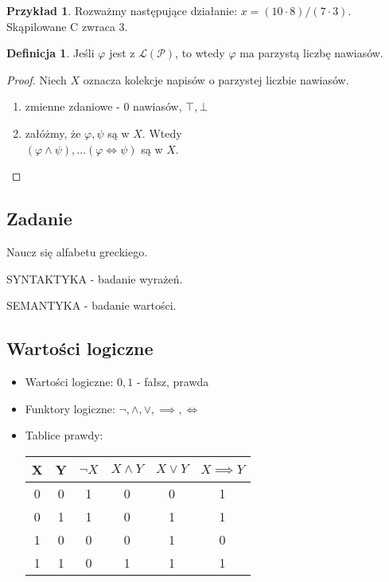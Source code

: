 \documentclass{article}
\theoremstyle{definition}
\newtheorem{de}{Definicja}[subsection]
\theoremstyle{definition}
\theoremstyle{definition}
\newtheorem{pk}{Przykład}[subsection]
\theoremstyle{definition}
\begin{document}
\begin{pk}
Rozważmy następujące działanie: $x=(10\cdot 8)/(7\cdot 3)$. Skąpilowane C zwraca $3$.
\end{pk}

\begin{de}
Jeśli $\varphi$ jest z $\mathcal{L}(\mathcal{P})$, to wtedy $\varphi$ ma parzystą liczbę nawiasów.
\begin{proof}
Niech $X$ oznacza kolekcje napisów o parzystej liczbie nawiasów.
\begin{enumerate}
    \item zmienne zdaniowe - 0 nawiasów, $\top, \bot$
    \item załóżmy, że $\varphi, \psi$ są w $X$. Wtedy\\
    $(\varphi \land \psi), ... (\varphi \iff \psi)$ są w $X$.
\end{enumerate}
\end{proof}
\end{de}

\subsection{Zadanie}
Naucz się alfabetu greckiego.

SYNTAKTYKA - badanie wyrażeń.

SEMANTYKA - badanie wartości.

\subsection{Wartości logiczne}
\begin{itemize}
    \item Wartości logiczne: $0, 1$ - fałsz, prawda
    \item Funktory logiczne: $\neg, \land, \lor, \implies, \iff$
    \item Tablice prawdy:\\
\begin{tabular}{|c|c|c|c|c|c|}
    \hline
    X & Y & $\neg X$ & $X\land Y$ & $X\lor Y$ & $X\implies Y$\\
    \hline
    0 & 0 & 1 & 0 & 0 & 1\\
    0 & 1 & 1 & 0 & 1 & 1\\
    1 & 0 & 0 & 0 & 1 & 0\\
    1 & 1 & 0 & 1 & 1 & 1\\
    \hline
\end{tabular}
\end{itemize}
\end{document}
